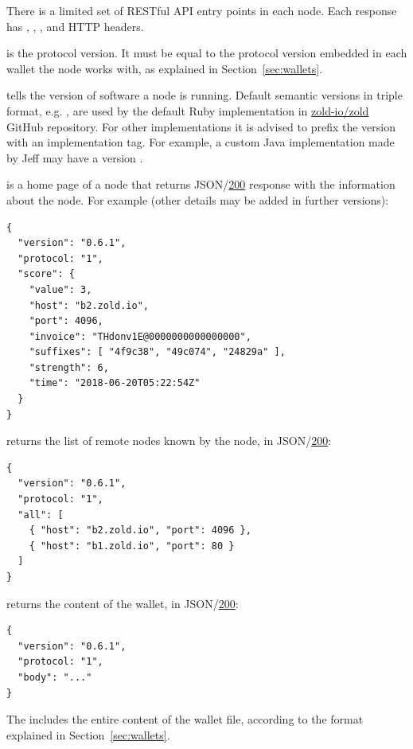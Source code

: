 \documentclass{main}
\begin{document}
There is a limited set of RESTful API entry points in each node.
Each response has ,
, , and 
HTTP headers.

 is the protocol version.
It must be equal to the protocol version embedded in each wallet the
node works with, as explained in Section~\ref{sec:wallets}.

 tells the version of software a node is running.
Default semantic versions in triple format, e.g. , are used
by the default Ruby implementation in
\href{https://github.com/zold-io/zold}{zold-io/zold} GitHub repository.
For other implementations it is
advised to prefix the version with an implementation tag. For example,
a custom Java implementation made by Jeff may have a version .

 is a home page of a node that returns
JSON/\href{https://www.w3.org/Protocols/rfc2616/rfc2616-sec10.html#sec10.2.1}{200}
response with the
information about the node. For example (other details may be added in
further versions):

\begin{verbatim}
{
  "version": "0.6.1",
  "protocol: "1",
  "score": {
    "value": 3,
    "host": "b2.zold.io",
    "port": 4096,
    "invoice": "THdonv1E@0000000000000000",
    "suffixes": [ "4f9c38", "49c074", "24829a" ],
    "strength": 6,
    "time": "2018-06-20T05:22:54Z"
  }
}
\end{verbatim}

 returns the list of remote nodes known by the node,
in JSON/\href{https://www.w3.org/Protocols/rfc2616/rfc2616-sec10.html#sec10.2.1}{200}:

\begin{verbatim}
{
  "version": "0.6.1",
  "protocol: "1",
  "all": [
    { "host": "b2.zold.io", "port": 4096 },
    { "host": "b1.zold.io", "port": 80 }
  ]
}\end{verbatim}

 returns the content of the wallet, in
JSON/\href{https://www.w3.org/Protocols/rfc2616/rfc2616-sec10.html#sec10.2.1}{200}:

\begin{verbatim}
{
  "version": "0.6.1",
  "protocol: "1",
  "body": "..."
}\end{verbatim}

The  includes the entire content of the wallet file, according
to the format explained in Section~\ref{sec:wallets}.
\end{document}
